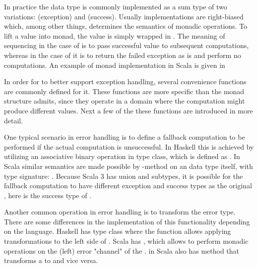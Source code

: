 In practice the  data type is commonly implemented as a sum type of two variations:  (exception) and  (success). Usually implementations are right-biased which, among other things, determines the semantics of monadic operations. To lift a value into  monad, the value is simply wrapped in . The meaning of sequencing in the case of  is to pass successful value to subsequent computations, whereas in the case of  it is to return the failed exception as is and perform no computations. An example of  monad implementation in Scala is given in 



In order for  to better support exception handling, several convenience functions are commonly defined for it. These functions are more specific than the monad structure admits, since they operate in a domain where the computation might produce different values. Next a few of the these functions are introduced in more detail.

One typical scenario in error handling is to define a fallback computation to be performed if the actual computation is unsuccessful. In Haskell this is achieved by utilizing an associative binary operation in  type class, which is defined as . In Scala similar semantics are made possible by  -method on an  data type itself, with type signature: . Because Scala 3 has union and subtypes, it is possible for the fallback computation to have different exception and success types as the original , here  is the success type of .

Another common operation in error handling is to transform the error type. There are some differences in the implementation of this functionality depending on the language. Haskell has  type class where the function  allows applying transformations to the left side of . Scala has , which allows to perform monadic operations on the (left) error "channel" of the .  in Scala also has  method that transforms a  to  and vice versa.

